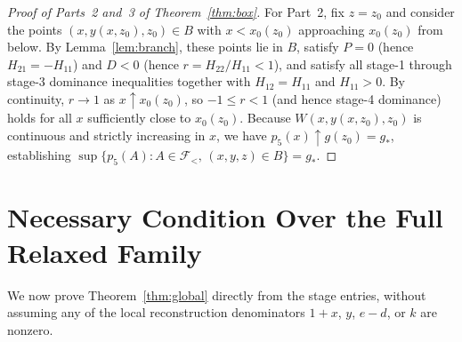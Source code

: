 \documentclass[11pt]{article}
\theoremstyle{remark}
\begin{document}
\begin{proof}[Proof of Parts~2 and~3 of Theorem~\ref{thm:box}]
For Part~2, fix $z=z_0$ and consider the points $(x,y(x,z_0),z_0)\in B$ with
$x < x_0(z_0)$ approaching $x_0(z_0)$ from below. By Lemma~\ref{lem:branch},
these points lie in $B$, satisfy $P=0$ (hence $H_{21}=-H_{11}$) and $D<0$
(hence $r=H_{22}/H_{11}<1$), and satisfy all stage-1 through stage-3 dominance
inequalities together with $H_{12}=H_{11}$ and $H_{11}>0$. By continuity,
$r\to 1$ as $x\uparrow x_0(z_0)$, so $-1\le r<1$ (and hence stage-4 dominance)
holds for all $x$ sufficiently close to $x_0(z_0)$. Because $W(x,y(x,z_0),z_0)$
is continuous and strictly increasing in $x$, we have $p_5(x)\uparrow g(z_0)=g_*$,
establishing $\sup\{p_5(A): A\in\mathcal{F}_{<},\, (x,y,z)\in B\}=g_*$.
\end{proof}

\section{Necessary Condition Over the Full Relaxed Family}\label{sec:global}

We now prove Theorem~\ref{thm:global} directly from the stage entries, without
assuming any of the local reconstruction denominators $1+x$, $y$, $e-d$, or $k$
are nonzero.
\end{document}
